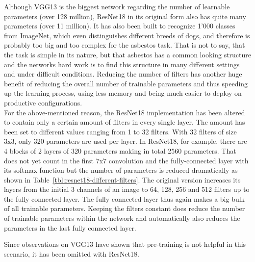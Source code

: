 Although VGG13 is the biggest network regarding the number of learnable parameters (over 128 million), ResNet18 in its original form also has quite many parameters (over 11 million). It has also been built to recognize 1'000 classes from ImageNet, which even distinguishes different breeds of dogs, and therefore is probably too big and too complex for the asbestos task. That is not to say, that the task is simple in its nature, but that asbestos has a common looking structure and the networks hard work is to find this structure in many different settings and under difficult conditions. Reducing the number of filters has another huge benefit of reducing the overall number of trainable parameters and thus speeding up the learning process, using less memory and being much easier to deploy on productive configurations.\\

For the above-mentioned reason, the ResNet18 implementation has been altered to contain only a certain amount of filters in every single layer. The amount has been set to different values ranging from 1 to 32 filters. With 32 filters of size 3x3, only 320 parameters are used per layer. In ResNet18, for example, there are 4 blocks of 2 layers of 320 parameters making in total 2560 parameters. That does not yet count in the first 7x7 convolution and the fully-connected layer with its softmax function but the number of parameters is reduced dramatically as shown in Table~\ref{tbl:resnet18-different-filters}. The original version increases its layers from the initial 3 channels of an image to 64, 128, 256 and 512 filters up to the fully connected layer. The fully connected layer thus again makes a big bulk of all trainable parameters. Keeping the filters constant does reduce the number of trainable parameters within the network and automatically also reduces the parameters in the last fully connected layer.

Since observations on VGG13 have shown that pre-training is not helpful in this scenario, it has been omitted with ResNet18.


